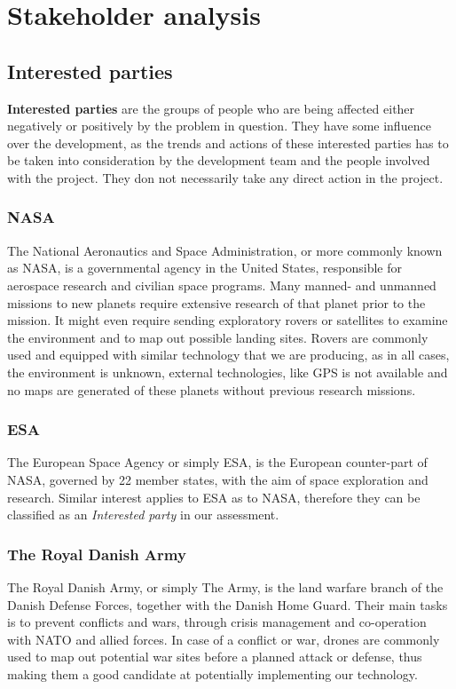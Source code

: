 \clearpage
\section{Stakeholder analysis}
	
\subsection{Interested parties}
\textbf{Interested parties} are the groups of people who are being affected either negatively or positively by the problem in question. They have some influence over the development, as the trends and actions of these interested parties has to be taken into consideration by the development team and the people involved with the project. They don not necessarily take any direct action in the project.

\subsubsection{NASA}
The National Aeronautics and Space Administration, or more commonly known as NASA, is a governmental agency in the United States, responsible for aerospace research and civilian space programs. Many manned- and unmanned missions to new planets require extensive research of that planet prior to the mission. It might even require sending exploratory rovers or satellites to examine the environment and to map out possible landing sites. Rovers are commonly used and equipped with similar technology that we are producing, as in all cases, the environment is unknown, external technologies, like GPS is not available and no maps are generated of these planets without previous research missions. 

\subsubsection{ESA}
The European Space Agency or simply ESA, is the European counter-part of NASA, governed by 22 member states, with the aim of space exploration and research. Similar interest applies to ESA as to NASA, therefore they can be classified as an \textit{Interested party} in our assessment.

\subsubsection{The Royal Danish Army}
The Royal Danish Army, or simply The Army, is the land warfare branch of the Danish Defense Forces, together with the Danish Home Guard. Their main tasks is to prevent conflicts and wars, through crisis management and co-operation with NATO and allied forces\cite{armytasks}. In case of a conflict or war, drones are commonly used to map out potential war sites before a planned attack or defense, thus making them a good candidate at potentially implementing our technology.

